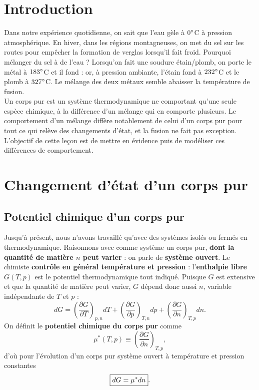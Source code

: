 \documentclass[11pt,a4paper]{report}
\begin{document}
\newpage
\section*{Introduction}

Dans notre expérience quotidienne, on sait que l'eau gèle à $0\degree$C à pression atmosphérique. En hiver, dans les régions montagneuses, on met du sel sur les routes pour empêcher la formation de verglas lorsqu'il fait froid. Pourquoi mélanger du sel à de l'eau ? Lorsqu'on fait une soudure étain/plomb, on porte le métal à $183\degree$C et il fond : or, à pression ambiante, l'étain fond à $232\degree$C et le plomb à $327\degree$C. Le mélange des deux métaux semble abaisser la température de fusion.\\

Un corps pur est un système thermodynamique ne comportant qu'une seule espèce chimique, à la différence d'un mélange qui en comporte plusieurs. Le comportement d'un mélange diffère notablement de celui d'un corps pur pour tout ce qui relève des changements d'état, et la fusion ne fait pas exception. L'objectif de cette leçon est de mettre en évidence puis de modéliser ces différences de comportement.

\section{Changement d'état d'un corps pur}

\subsection{Potentiel chimique d'un corps pur}

Jusqu'à présent, nous n'avons travaillé qu'avec des systèmes isolés ou fermés en thermodynamique. Raisonnons avec comme système un corps pur, \textbf{dont la quantité de matière $n$ peut varier} : on parle de \textbf{système ouvert}. Le chimiste \textbf{contrôle en général température et pression} : l'\textbf{enthalpie libre} $G(T,p)$ est le potentiel thermodynamique tout indiqué. Puisque $G$ est extensive et que la quantité de matière peut varier, $G$ dépend donc aussi $n$, variable indépendante de $T$ et $p$ :
\begin{equation}
	dG = \left(\frac{\partial G}{\partial T}\right)_{p,n} dT  
	+  \left(\frac{\partial G}{\partial p}\right)_{T,n} dp  
	+  \left(\frac{\partial G}{\partial n}\right)_{T,p} dn.
\end{equation}
On définit le \textbf{potentiel chimique du corps pur} comme
\begin{equation}
	\mu^*(T,p) \equiv \left(\frac{\partial G}{\partial n}\right)_{T,p},
\end{equation}
d'où pour l'évolution d'un corps pur système ouvert à température et pression constantes
\begin{equation}
	\boxed{dG = \mu^* dn}.\\
\end{equation}
\end{document}
